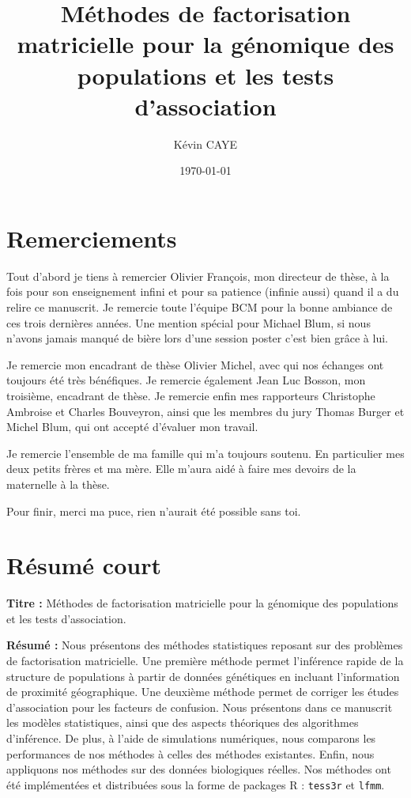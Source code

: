 \documentclass[12pt,a4paper,twoside]{ugathesis}
\author{Kévin CAYE}
\date{\today}
\title{Méthodes de factorisation matricielle pour la génomique des populations et les tests d'association}
\begin{document}
\maketitle
\tableofcontents

\baselineskip 0.7cm
\frontmatter

\chapter{Remerciements}
\label{sec:org7fbb512}

Tout d'abord je tiens à remercier Olivier François, mon directeur de thèse, à la
fois pour son enseignement infini et pour sa patience (infinie aussi) quand il a
du relire ce manuscrit. Je remercie toute l'équipe BCM pour la bonne ambiance de
ces trois dernières années. Une mention spécial pour Michael Blum, si nous
n'avons jamais manqué de bière lors d'une session poster c'est bien grâce à lui.

Je remercie mon encadrant de thèse Olivier Michel, avec qui nos échanges ont
toujours été très bénéfiques. Je remercie également Jean Luc Bosson, mon
troisième, encadrant de thèse. Je remercie enfin mes rapporteurs Christophe
Ambroise et Charles Bouveyron, ainsi que les membres du jury Thomas Burger et
Michel Blum, qui ont accepté d'évaluer mon travail.

Je remercie l'ensemble de ma famille qui m'a toujours soutenu. En particulier
mes deux petits frères et ma mère. Elle m'aura aidé à faire mes devoirs de la
maternelle à la thèse.

Pour finir, merci ma puce, rien n'aurait été possible sans toi.

\chapter{Résumé court}
\label{sec:orgcf8491a}

\noindent \textbf{Titre :} Méthodes de factorisation matricielle pour la génomique des
populations et les tests d'association.

\noindent \textbf{Résumé :} Nous présentons des méthodes statistiques reposant sur des
problèmes de factorisation matricielle. Une première méthode permet l'inférence
rapide de la structure de populations à partir de données génétiques en incluant
l'information de proximité géographique. Une deuxième méthode permet de corriger
les études d'association pour les facteurs de confusion. Nous présentons dans ce
manuscrit les modèles statistiques, ainsi que des aspects théoriques des
algorithmes d'inférence. De plus, à l'aide de simulations numériques, nous
comparons les performances de nos méthodes à celles des méthodes existantes.
Enfin, nous appliquons nos méthodes sur des données biologiques réelles. Nos
méthodes ont été implémentées et distribuées sous la forme de packages R :
\texttt{tess3r} et \texttt{lfmm}.
\end{document}
